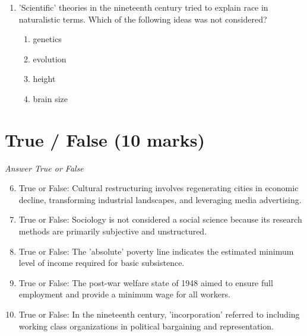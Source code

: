 \documentclass[12pt]{article}
\begin{document}
\begin{enumerate}[label=\arabic*.]
\begin{enumerate}[label=(\alph*)]
    \item the findings are amenable to statistical analysis
    \item it is conducted over a period of several years
    \item it uncovers rich, detailed accounts from an insider's perspective
    \item it compares findings from a number of different cases
\end{enumerate}
\item 'Scientific' theories in the nineteenth century tried to explain race in naturalistic terms. Which of the following ideas was not considered?
\begin{enumerate}[label=(\alph*)]
    \item genetics
    \item evolution
    \item height
    \item brain size
\end{enumerate}
\end{enumerate}

\section*{True / False (10 marks)}
\textit{Answer True or False}
\begin{enumerate}[label=\arabic*.]
\setcounter{enumi}{5}
\item True or False: Cultural restructuring involves regenerating cities in economic decline, transforming industrial landscapes, and leveraging media advertising.
\item True or False: Sociology is not considered a social science because its research methods are primarily subjective and unstructured.
\item True or False: The 'absolute' poverty line indicates the estimated minimum level of income required for basic subsistence.
\item True or False: The post-war welfare state of 1948 aimed to ensure full employment and provide a minimum wage for all workers.
\item True or False: In the nineteenth century, 'incorporation' referred to including working class organizations in political bargaining and representation.
\end{enumerate}
\end{document}
